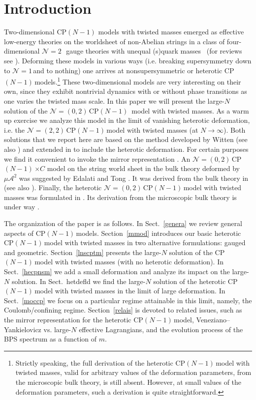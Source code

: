 \documentclass[epsfig,12pt]{article}
\newcommand{\ntwo}{${\mathcal N}=2\,$}
\newcommand{\none}{${\mathcal N}=1\,$}
\newcommand{\ntt}{${\mathcal N}=(2,2)\,$}
\newcommand{\nzt}{${\mathcal N}=(0,2)\,$}
\newcommand{\cpn}{CP$(N-1)\,$}
\newcommand{\ca}{{\mathcal A}}
\begin{document}
\newpage


\section{Introduction}
\setcounter{equation}{0}

Two-dimensional  CP$(N-1)$ models with twisted masses
emerged as effective low-energy theories on
the worldsheet of non-Abelian strings in a class of 
four-dimensional \ntwo\, gauge theories with unequal (s)quark 
masses~\cite{HT1,ABEKY,SYmon,HT2} (for reviews see  \cite{Trev}). 
Deforming these models in various ways (i.e. breaking supersymmetry down to \none and to nothing)
one arrives at nonsupersymmetric or heterotic \cpn models.\footnote{
Strictly speaking, the full derivation of the
heterotic \cpn model with twisted masses, valid for arbitrary values of
the deformation parameters,  from the microscopic bulk theory, is still absent.
However, at small values of the deformation parameters,
such a derivation is quite straightforward.} These two-dimensional models are very 
interesting on their own,
since they exhibit nontrivial dynamics with or without phase transitions 
as one varies the twisted mass scale.
In this paper we will present the large-$N$ solution of the \nzt \mbox{\cpn}  model with twisted
masses. As a warm up exercise we analyze this model in the limit of vanishing heterotic deformation,
i.e. the \ntt \cpn model with twisted masses (at $N\to\infty$). Both solutions 
that we report here are based on the method developed by Witten
\cite{W79,W93} (see also \cite{dadvl}) and extended in \cite{SYhet} to include the heterotic deformation.
For certain purposes we find it convenient to invoke the mirror
representation \cite{MR1,MR2}. An \nzt \cpn$\times C$
model on the string world sheet in the bulk theory deformed by $\mu\ca^2$
was suggested by Edalati and Tong \cite{EdTo}.
It was derived from the bulk theory in \cite{SY1} (see also \cite{BSY1,BSY2}).
Finally, the heterotic \nzt  \cpn model with twisted masses was formulated in \cite{BSY3}.
Its derivation from the microscopic bulk theory is under way \cite{underway}.

The organization of the paper is as follows. In Sect.~\ref{genera} we review general aspects of \cpn models.  
Section~\ref{mmod} introduces our basic heterotic \cpn model with twisted masses in two alternative formulations: gauged and geometric. Section~\ref{lnscptm} presents the large-$N$ solution of the \cpn model with twisted
masses (with no heterotic deformation). In Sect.~\ref{hecpnsm} we add a small deformation and analyze its impact on the
 large-$N$ solution. In Sect.~{hetdefld} we find the large-$N$ solution of the heterotic \cpn model with twisted
masses in the limit of large deformation. In Sect.~\ref{moccp} we focus on a particular regime attainable in this
limit, namely, the Coulomb/confining regime. Section~\ref{relais} is devoted to related issues, such as 
the mirror representation for the heterotic \cpn model, Veneziano--Yankielovicz vs. large-$N$ effective Lagrangians,
and the evolution process of the BPS spectrum as a function of $m$.
\end{document}

